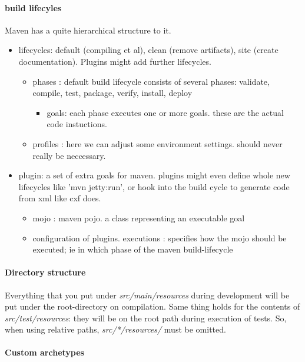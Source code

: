 		
\paragraph{build lifecyles} 

Maven has a quite hierarchical structure to it. 

\begin{itemize}
    \item lifecycles: default (compiling et al), clean (remove artifacts), site (create documentation). Plugins might add further lifecycles. 
    \begin{itemize}
        \item phases : default build lifecycle consists of several phases: validate, compile, test, package, verify, install, deploy
        \begin{itemize}
            \item goals: each phase executes one or more goals. these are the actual code instuctions. 
        \end{itemize}
        \item profiles : here we can adjust some environment settings. should never really be neccessary.
    \end{itemize}
    \item plugin: a set of extra goals for maven. plugins might even define whole new lifecycles like 'mvn jetty:run', or hook into the build cycle to generate code from xml like cxf does. 
    \begin{itemize}
        \item mojo : maven pojo. a class representing an executable goal
        \item configuration of plugins. executions : specifies how the mojo should be executed; ie in which phase of the maven build-lifecycle
    \end{itemize}
\end{itemize}

\paragraph{Directory structure}
Everything that you put under \emph{src/main/resources} during development will be put under the root-directory on compilation. Same thing holds for the contents of \emph{src/test/resources}: they will be on the root path during execution of tests. So, when using relative paths, \emph{src/*/resources/} must be omitted.


\paragraph{Custom archetypes}

